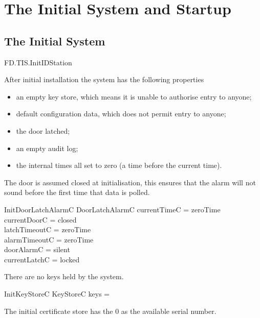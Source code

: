 
\chapter{The Initial System and Startup}
\label{sec:Start}
\section{The Initial System}

\begin{traceunit}{FD.TIS.InitIDStation}
\end{traceunit}

After initial installation the system has the following properties
\begin{itemize}
\item
an empty key store, which means it is unable to authorise entry to anyone;
\item
default configuration data, which does not permit entry to anyone;
\item
the door latched;
\item
an empty audit log;
\item
the internal times all set to zero (a time before the current time).
\end{itemize}

The door is assumed closed at initialisation, this ensures that the alarm
will not sound before the first time that data is polled.

\begin{schema}{InitDoorLatchAlarmC}
        DoorLatchAlarmC
\where
	currentTimeC = zeroTime
\\	currentDoorC = closed
\\	latchTimeoutC = zeroTime
\\	alarmTimeoutC = zeroTime
\\      doorAlarmC = silent
\\      currentLatchC = locked
\end{schema}

There are no keys held by the system.

\begin{schema}{InitKeyStoreC}
        KeyStoreC
\where
        keys = \emptyset
\end{schema}

The initial certificate store has the 0 as the available serial number.

